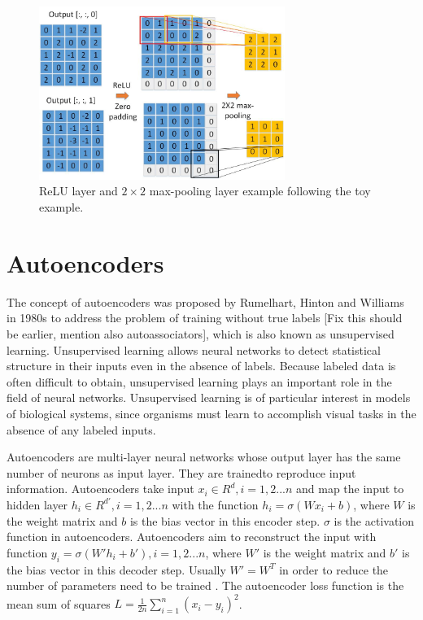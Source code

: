 \begin{figure}[th]
\centering
\includegraphics[width=80mm]{Figures/CNN2}
\decoRule
\caption{ReLU layer and \(2 \times 2\) max-pooling layer example following the toy example.}
\label{fig:cnn2}
\end{figure}




\section{Autoencoders}

The concept of autoencoders was proposed by Rumelhart, Hinton and Williams in 1980s to address the problem of training without true labels \cite{rumelhart_learning_1985} [Fix this should be earlier, mention also autoassociators], which is also known as unsupervised learning. Unsupervised learning allows neural networks to detect statistical structure in their inputs even in the absence of labels. Because labeled data is often difficult to obtain, unsupervised learning plays an important role in the field of neural networks. Unsupervised learning is of particular interest in models of biological systems, since organisms must learn to accomplish visual tasks in the absence of any labeled inputs.

Autoencoders are multi-layer neural networks whose output layer has the same number of neurons as input layer. They are trainedto reproduce input information. Autoencoders take input \(x_{i} \in R^d, i = 1, 2...n\) and map the input to hidden layer \(h_{i} \in R^{d'}, i = 1, 2...n\) with the function \(h_{i} = \sigma(Wx_{i} + b)\), where \(W\) is the weight matrix and \(b\) is the bias vector in this encoder step. \(\sigma\) is the activation function in autoencoders. Autoencoders aim to reconstruct the input with function \(y_{i} = \sigma(W'h_{i} + b'), i = 1, 2...n\), where \(W'\) is the weight matrix and \(b'\) is the bias vector in this decoder step. Usually \(W' = W^T\) in order to reduce the number of parameters need to be trained \cite{masci_stacked_2011}. The autoencoder loss function is the mean sum of squares \(L = \frac{1}{2n}\sum_{i = 1}^{n} (x_{i}-y_{i})^2\).


